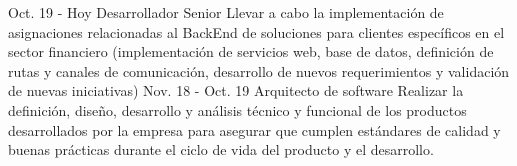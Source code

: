 \documentclass[]{cv-class}
\begin{document}
\begin{entrylist}
	\entry
	{Oct. 19 - Hoy}
	{Desarrollador Senior}
	{\href{https://tecso.coop/}{}}
	{\justifying Llevar a cabo la implementación de asignaciones relacionadas al BackEnd de soluciones para clientes específicos en el sector financiero (implementación de servicios web, base de datos, definición de rutas y canales de comunicación, desarrollo de nuevos requerimientos y validación de nuevas iniciativas)}
	\entry
	{Nov. 18 - Oct. 19}
	{Arquitecto de software}
	{\href{http://www.serviciosenweb.com/}{}}
	{\justifying Realizar la definición, diseño, desarrollo y análisis técnico y funcional de los productos desarrollados por la empresa para asegurar que cumplen estándares de calidad y buenas prácticas durante el ciclo de vida del producto y el desarrollo.}
	    

\end{entrylist}
\end{document}
